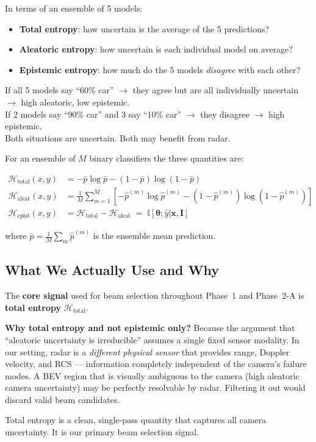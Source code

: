 \documentclass[12pt, a4paper]{article}
\newcommand{\Hent}{\mathcal{H}}
\theoremstyle{definition}
\begin{document}
\begin{plainbox}
In terms of an ensemble of 5 models:
\begin{itemize}
  \item \textbf{Total entropy}: how uncertain is the average of the 5 predictions?
  \item \textbf{Aleatoric entropy}: how uncertain is each individual model on average?
  \item \textbf{Epistemic entropy}: how much do the 5 models \emph{disagree} with each other?
\end{itemize}
If all 5 models say ``60\% car'' $\to$ they agree but are all individually uncertain
$\to$ high aleatoric, low epistemic.\\
If 2 models say ``90\% car'' and 3 say ``10\% car'' $\to$ they disagree
$\to$ high epistemic.\\
Both situations are uncertain. Both may benefit from radar.
\end{plainbox}

For an ensemble of $M$ binary classifiers the three quantities are:

\begin{align}
  \Hent_{\mathrm{total}}(x,y)
  &= -\bar{p}\log\bar{p} - (1-\bar{p})\log(1-\bar{p})
  \label{eq:total_entropy}\\[4pt]
  \Hent_{\mathrm{aleat}}(x,y)
  &= \frac{1}{M}\sum_{m=1}^{M}
    \!\left[-\hat{p}^{(m)}\log\hat{p}^{(m)}
    - (1-\hat{p}^{(m)})\log(1-\hat{p}^{(m)})\right]
  \label{eq:aleatoric_entropy}\\[4pt]
  \Hent_{\mathrm{epist}}(x,y)
  &= \Hent_{\mathrm{total}} - \Hent_{\mathrm{aleat}}
  \;=\; \mathbb{I}[\boldsymbol{\theta};\hat{y}|\mathbf{x},\mathbf{I}]
  \label{eq:epistemic_entropy}
\end{align}

where $\bar{p} = \frac{1}{M}\sum_m\hat{p}^{(m)}$ is the ensemble mean prediction.

\subsection{What We Actually Use and Why}
\label{sec:what_we_use}

\begin{corebox}
The \textbf{core signal} used for beam selection throughout Phase~1 and Phase~2-A
is \textbf{total entropy} $\Hent_{\mathrm{total}}$.

\textbf{Why total entropy and not epistemic only?}
Because the argument that ``aleatoric uncertainty is irreducible'' assumes a
single fixed sensor modality. In our setting, radar is a \emph{different physical
sensor} that provides range, Doppler velocity, and RCS --- information completely
independent of the camera's failure modes. A BEV region that is visually ambiguous
to the camera (high aleatoric camera uncertainty) may be perfectly resolvable by
radar. Filtering it out would discard valid beam candidates.

Total entropy is a clean, single-pass quantity that captures all camera uncertainty.
It is our primary beam selection signal.
\end{corebox}
\end{document}
